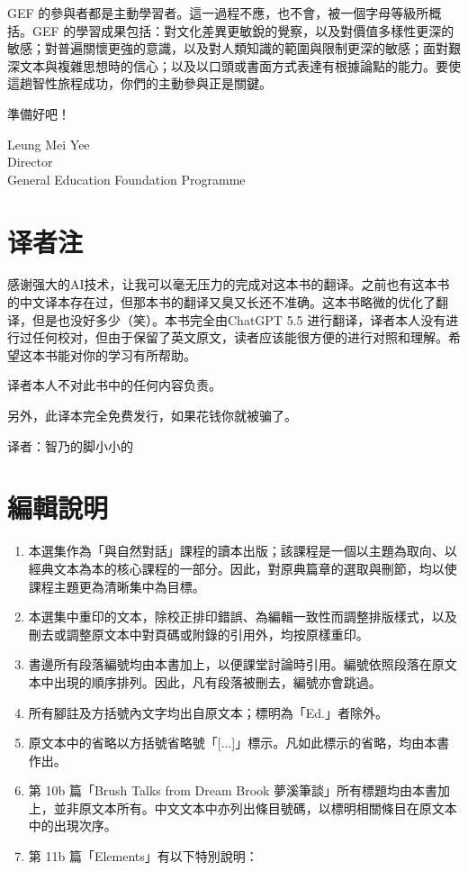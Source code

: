 \documentclass[UTF8,zihao=-4]{ctexart}
\begin{document}
\noindent GEF 的參與者都是主動學習者。這一過程不應，也不會，被一個字母等級所概括。GEF 的學習成果包括：對文化差異更敏銳的覺察，以及對價值多樣性更深的敏感；對普遍關懷更強的意識，以及對人類知識的範圍與限制更深的敏感；面對艱深文本與複雜思想時的信心；以及以口頭或書面方式表達有根據論點的能力。要使這趟智性旅程成功，你們的主動參與正是關鍵。

\noindent 準備好吧！

\vspace{1em}

\noindent Leung Mei Yee\\
Director\\
General Education Foundation Programme

\section*{译者注}

\noindent 感谢强大的AI技术，让我可以毫无压力的完成对这本书的翻译。之前也有这本书的中文译本存在过，但那本书的翻译又臭又长还不准确。这本书略微的优化了翻译，但是也没好多少（笑）。本书完全由ChatGPT 5.5 进行翻译，译者本人没有进行过任何校对，但由于保留了英文原文，读者应该能很方便的进行对照和理解。希望这本书能对你的学习有所帮助。

\noindent 译者本人不对此书中的任何内容负责。

\noindent 另外，此译本完全免费发行，如果花钱你就被骗了。

\hfill 译者：智乃的脚小小的




\section*{編輯說明}
\begin{enumerate}
\item 本選集作為「與自然對話」課程的讀本出版；該課程是一個以主題為取向、以經典文本為本的核心課程的一部分。因此，對原典篇章的選取與刪節，均以使課程主題更為清晰集中為目標。
\item 本選集中重印的文本，除校正排印錯誤、為編輯一致性而調整排版樣式，以及刪去或調整原文本中對頁碼或附錄的引用外，均按原樣重印。
\item 書邊所有段落編號均由本書加上，以便課堂討論時引用。編號依照段落在原文本中出現的順序排列。因此，凡有段落被刪去，編號亦會跳過。
\item 所有腳註及方括號內文字均出自原文本；標明為「Ed.」者除外。
\item 原文本中的省略以方括號省略號「[...]」標示。凡如此標示的省略，均由本書作出。
\item 第 10b 篇「Brush Talks from Dream Brook 夢溪筆談」所有標題均由本書加上，並非原文本所有。中文文本中亦列出條目號碼，以標明相關條目在原文本中的出現次序。
\item 第 11b 篇「Elements」有以下特別說明：
\end{enumerate}
\end{document}
